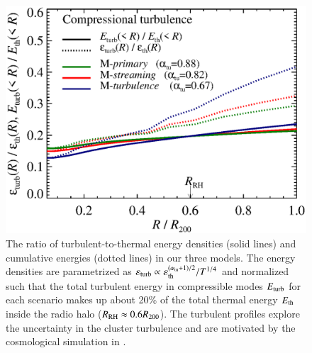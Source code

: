 \documentclass[fleqn,usenatbib,useAMS]{mnras}
\newcommand{\eps}{\varepsilon}
\begin{document}
\begin{figure}
  \includegraphics[width=1.0\columnwidth]{turb_profile_ratio_tot.eps}
  \caption{The ratio of turbulent-to-thermal energy densities (solid
    lines) and cumulative energies (dotted lines) in our three
    models. The energy densities are parametrized as
    $\eps_\rmn{turb} \propto
    \eps_\rmn{th}^{(\alpha_{\rmn{tu}}+1)/2}/T^{1/4}$ and
    normalized such that the total turbulent energy in compressible
    modes $E_{\mathrm{turb}}$ for each scenario makes up about 20\% of the
    total thermal energy $E_{\mathrm{th}}$ inside the radio halo
    ($R_{\mathrm{RH}}\approx0.6R_{200}$). The turbulent profiles explore
    the uncertainty in the cluster turbulence and are motivated by the
    cosmological simulation in
    \citep{2009ApJ...705.1129L,2010ApJ...725.1452S,2011A&A...529A..17V}.}
  \label{fig:turb}
\end{figure}
\end{document}
